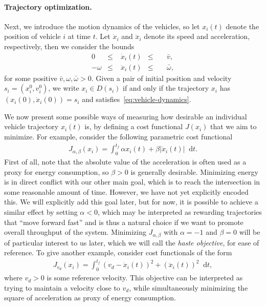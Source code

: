 \documentclass[a4paper]{report}
\newcounter{mycomment}
\newcommand{\comment}[2][]{%
    \refstepcounter{mycomment}%
    {%
        \setstretch{0.7}%
        \StrLeft{#2}{60}[\shortcaption]%
        \todo[%
        color={red!100!green!33},%
        size=\small,%
        caption={\protect\hypertarget{todo\themycomment}{}\textit{\thesubsection}%
        \hspace{1.0em}{\shortcaption}~\textit{[\themycomment]}}, #1]%
        {%
        #2~\hyperlink{todo\themycomment}{\textit{[\themycomment]}}}
    }%
}
\theoremstyle{definition}
\theoremstyle{plain}
\newcommand*\diff{\mathop{}\!\mathrm{d}}
\begin{document}
\paragraph{Trajectory optimization.}
Next, we introduce the motion dynamics of the vehicles, so let $x_{i}(t)$ denote
the position of vehicle $i$ at time $t$.
%
Let $\dot{x}_{i}$ and $\ddot{x}_{i}$ denote its speed and acceleration,
respectively, then we consider the bounds
\begin{subequations}\label{eq:vehicle-dynamics}
\begin{alignat}{3}
  0         & \leq & \; \dot{x}_{i}(t)  & \leq && \; \bar{v}  , \label{eq:speed-constr} \\
  {-\omega} & \leq & \; \ddot{x}_{i}(t) & \leq && \; \bar{\omega} ,
\end{alignat}
\end{subequations}
for some positive $\bar{v}, \omega, \bar{\omega} > 0$.
%
Given a pair of initial position and velocity $s_{i} = (x_{i}^{0}, v_{i}^{0})$,
we write $x_{i} \in D(s_{i})$ if and only if the trajectory $x_{i}$ has
$(x_{i}(0), \dot{x}_{i}(0)) = s_{i}$ and satisfies~\eqref{eq:vehicle-dynamics}.

We now present some possible ways of measuring how desirable an individual
vehicle trajectory $x_{i}(t)$ is, by defining a cost functional $J(x_{i})$ that
we aim to minimize.
%
For example, consider the following parametric cost functional
\begin{align}
  J_{\alpha,\beta}(x_{i}) = \int_{0}^{t_{f}} \alpha x_{i}(t) + \beta |\ddot{x}_{i}(t)| \diff t .
\end{align}
%
First of all, note that the absolute value of the acceleration is often used as
a proxy for energy consumption, so $\beta > 0$ is generally desirable.
%
%
Minimizing energy is in direct conflict with our other main goal, which is to
reach the intersection in some reasonable amount of time. However, we have not
yet explicitly encoded this.
%
We will explicitly add this goal later, but for now, it is possible to achieve a
similar effect by setting $\alpha < 0$, which may be interpreted as rewarding
trajectories that ``move forward fast'' and is thus a natural choice if we want
to promote overall throughput of the system.
%
Minimizing $J_{\alpha,\beta}$ with $\alpha = -1$ and $\beta = 0$ will be of
particular interest to us later, which we will call the \emph{haste objective},
for ease of reference.
%
To give another example, consider cost functionals of the form
\begin{align}\label{eq:energy-objective}
  J_{v_{d}}(x_{i}) = \int_{0}^{t_{f}} {(v_{d} - \dot{x}_{i}(t))}^{2} + {(\ddot{x}_{i}(t))}^{2} \diff t ,
\end{align}
where $v_{d} > 0$ is some reference velocity. This objective can be interpreted
as trying to maintain a velocity close to $v_{d}$, while simultaneously
minimizing the square of acceleration as proxy of energy consumption.
\end{document}
